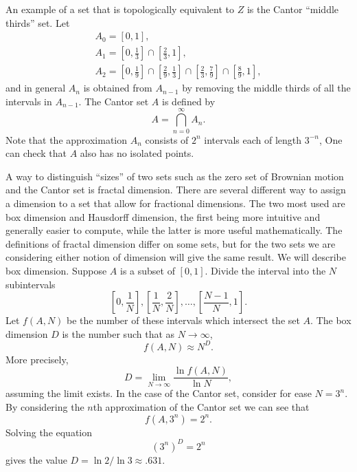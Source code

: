 \documentclass{stml-l}
\theoremstyle{definition}
\numberwithin{equation}{chapter}
\numberwithin{figure}{chapter}
\numberwithin{figure}{section}
\begin{document}
An example of a set that is topologically equivalent to $Z$ is the
Cantor ``middle thirds'' set. Let
\begin{gather*}
A_{0}=[0,1],\\
A_{1}=[0,\tfrac{1}{3}]\cap[\tfrac{2}{3},1],\\
A_{2}=[0,\tfrac{1}{9}]\cap[\tfrac{2}{9},\tfrac{1}{3}]\cap[\tfrac{2}{3},\tfrac{7}{9}]\cap[\tfrac{8}{9},1],
\end{gather*}
and in general $A_{n}$ is obtained from $A_{n-1}$ by removing the
middle thirds of all the intervals in $A_{n-1}$. The Cantor set $A$
is defined by
\begin{equation*}
A=\bigcap\limits_{n=0}^{\infty}A_{n}.
\end{equation*}
Note that the approximation $A_{n}$ consists of $2^{n}$ intervals
each of length $3^{-n}$, One can check that $A$ also has no isolated
points.

A way to distinguish ``sizes'' of two sets such as the zero set of
Brownian motion and the Cantor set is fractal dimension. There are
several different way to assign a dimension to a set that allow for
fractional dimensions. The two most used are box dimension and
Hausdorff dimension, the first being more intuitive and generally
easier to compute, while the latter is more useful mathematically.
The definitions of fractal dimension differ on some sets, but for
the two sets we are considering either notion of dimension will give
the same result. We will describe box dimension. Suppose $A$ is a
subset of $[0,1]$. Divide the interval into the $N$ subintervals
\begin{equation*}
\left[0,\frac{1}{N}\right],\left[\frac{1}{N},\frac{2}{N}\right],\ldots
,\left[\frac{N-1}{N},1\right].
\end{equation*}
Let $f(A,N)$ be the number of these intervals which intersect the
set $A$. The box dimension $D$ is the number such that as $
N\rightarrow\infty$,
\begin{equation*}
f(A,N)\approx N^{D}.
\end{equation*}
More precisely,
\begin{equation*}
D=\lim\limits_{N\rightarrow\infty}\frac{\ln f(A,N)}{\ln N},
\end{equation*}
assuming the limit exists. In the case of the Cantor set, consider
for ease $N=3^{n}$. By considering the $n$th approximation of the
Cantor set we can see that
\begin{equation*}
f(A,3^{n})=2^{n}.
\end{equation*}
Solving the equation
\begin{equation*}
(3^{n})^{D}=2^{n}
\end{equation*}
gives the value $D=\ln 2/\ln 3\approx.631$.
\end{document}
